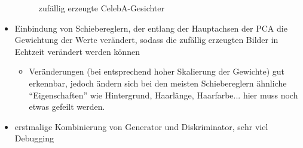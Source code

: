 \documentclass[10pt,a4paper]{report}
\begin{document}
\begin{itemize}
\begin{figure}[H]
\centering
{} 
\hspace{0.5cm}
\hspace{0.5cm}
\hspace{0.5cm}
\hspace{0.5cm}
\hspace{0.5cm}
\caption{zufällig erzeugte CelebA-Gesichter}
\end{figure}

\item Einbindung von Schiebereglern, der entlang der Hauptachsen der PCA die Gewichtung der Werte verändert, sodass die zufällig erzeugten Bilder in Echtzeit verändert werden können
\begin{itemize}
\item Veränderungen (bei entsprechend hoher Skalierung der Gewichte) gut erkennbar, jedoch ändern sich bei den meisten Schiebereglern ähnliche \enquote{Eigenschaften} wie Hintergrund, Haarlänge, Haarfarbe... hier muss noch etwas gefeilt werden.
\end{itemize}
\item erstmalige Kombinierung von Generator und Diskriminator, sehr viel Debugging
\end{itemize}
\end{document}

